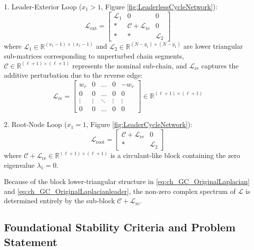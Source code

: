1. Leader-Exterior Loop ($x_1 > 1$, Figure \ref{fig:LeaderlessCycleNetwork}):
   \begin{equation} \label{eq:ch_GC_OriginalLaplacian}
   	\mathcal{L}_{\text{ext}} = \begin{bmatrix}
   		\mathcal{L}_1 & 0 & 0 \\
   		* & \mathcal{C} + \mathcal{L}_{\text{re}} & 0 \\
   		* & * & \mathcal{L}_2
   	\end{bmatrix}
   \end{equation}
   where $\mathcal{L}_1 \in \mathbb{R}^{(x_1-1) \times (x_1-1)}$ and $\mathcal{L}_2 \in \mathbb{R}^{(N-y_1) \times (N-y_1)}$ are lower triangular sub-matrices corresponding to unperturbed chain segments, $\mathcal{C} \in \mathbb{R}^{(\ell+1) \times (\ell+1)}$ represents the nominal sub-chain, and $\mathcal{L}_{\text{re}}$ captures the additive perturbation due to the reverse edge:
   \begin{equation}\label{eq:ch_GC_ReverseEdgeMatrix}
   	\mathcal{L}_{\text{re}} = \begin{bmatrix}
   		w_r & 0 & \dots & 0 & -w_r \\
   		0 & 0 & \dots & 0 & 0 \\
   		\vdots & \vdots & \ddots & \vdots & \vdots \\
   		0 & 0 & \dots & 0 & 0
   	\end{bmatrix} \in \mathbb{R}^{(\ell+1) \times (\ell+1)}
   \end{equation}

2. Root-Node Loop ($x_1 = 1$, Figure \ref{fig:LeaderCycleNetwork}):
   \begin{equation} \label{eq:ch_GC_OriginalLaplacianleader}
   	\mathcal{L}_{\text{root}} = \begin{bmatrix}
   		\mathcal{C} + \mathcal{L}_{\text{re}} & 0 \\
   		* & \mathcal{L}_2
   	\end{bmatrix}
   \end{equation}
   where $\mathcal{C} + \mathcal{L}_{\text{re}} \in \mathbb{R}^{(\ell+1) \times (\ell+1)}$ is a circulant-like block containing the zero eigenvalue $\lambda_1 = 0$.

Because of the block lower-triangular structure in \eqref{eq:ch_GC_OriginalLaplacian} and \eqref{eq:ch_GC_OriginalLaplacianleader}, the non-zero complex spectrum of $\mathcal{L}$ is determined entirely by the sub-block $\mathcal{C} + \mathcal{L}_{\text{re}}$.

\subsection{Foundational Stability Criteria and Problem Statement}


